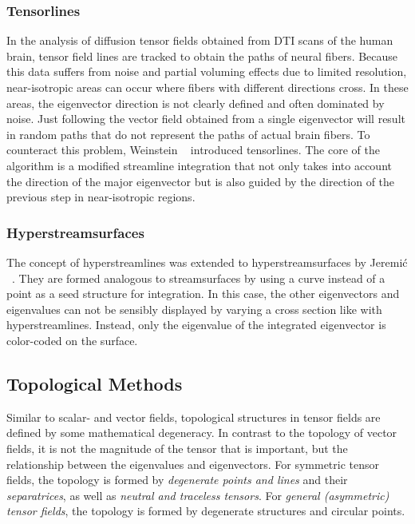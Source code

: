 \subsubsection{Tensorlines} %
%
In the analysis of diffusion tensor fields obtained from \ac{DTI} scans of the
human brain, tensor field lines are tracked to obtain the paths of neural
fibers.
%
Because this data suffers from noise and partial voluming effects due to limited
resolution, near-isotropic areas can occur where fibers with different
directions cross.
%
In these areas, the eigenvector direction is not clearly defined and often
dominated by noise.
%
Just following the vector field obtained from a single eigenvector will result
in random paths that do not represent the paths of actual brain fibers.
%
To counteract this problem, Weinstein \etal~\cite{Weinstein1999} introduced
tensorlines.
%
The core of the algorithm is a modified streamline integration that not only
takes into account the direction of the major eigenvector but is also guided
by the direction of the previous step in near-isotropic regions.
%

\subsubsection{Hyperstreamsurfaces} %
%
The concept of hyperstreamlines was extended to hyperstreamsurfaces by Jeremi\'c
\etal~\cite{Jeremic2002}.
%
They are formed analogous to streamsurfaces by using a curve instead of a point
as a seed structure for integration.
%
In this case, the other eigenvectors and eigenvalues can not be sensibly
displayed by varying a cross section like with hyperstreamlines.
%
Instead, only the eigenvalue of the integrated eigenvector is color-coded on the
surface.
%

\subsection{Topological Methods} %
\label{sub:tensor_topological}
%
Similar to scalar- and vector fields, topological structures in tensor fields
are defined by some mathematical degeneracy.
%
In contrast to the topology of vector fields, it is not the magnitude of the
tensor that is important, but the relationship between the eigenvalues and
eigenvectors.
%
For symmetric tensor fields, the topology is formed by \emph{degenerate points
and lines} and their \emph{separatrices}, as well as \emph{neutral and traceless
tensors}.
%
For \emph{general (asymmetric) tensor fields}, the topology is formed by
degenerate structures and circular points.
%

